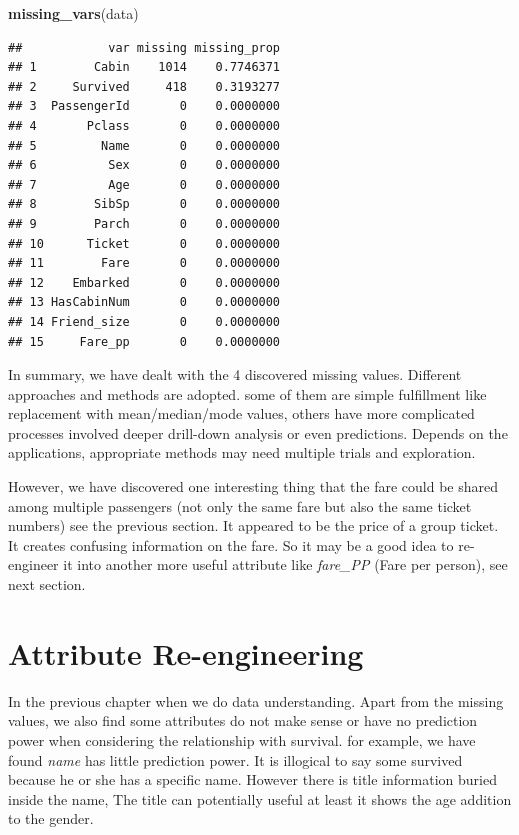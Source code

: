 \documentclass[
]{book}
\newenvironment{Shaded}{\begin{snugshade}}{\end{snugshade}}
\newcommand{\KeywordTok}[1]{\textcolor[rgb]{0.13,0.29,0.53}{\textbf{#1}}}
\newcommand{\NormalTok}[1]{#1}
\begin{document}
\begin{Shaded}
\begin{Highlighting}[]
\KeywordTok{missing_vars}\NormalTok{(data)}
\end{Highlighting}
\end{Shaded}

\begin{verbatim}
##            var missing missing_prop
## 1        Cabin    1014    0.7746371
## 2     Survived     418    0.3193277
## 3  PassengerId       0    0.0000000
## 4       Pclass       0    0.0000000
## 5         Name       0    0.0000000
## 6          Sex       0    0.0000000
## 7          Age       0    0.0000000
## 8        SibSp       0    0.0000000
## 9        Parch       0    0.0000000
## 10      Ticket       0    0.0000000
## 11        Fare       0    0.0000000
## 12    Embarked       0    0.0000000
## 13 HasCabinNum       0    0.0000000
## 14 Friend_size       0    0.0000000
## 15     Fare_pp       0    0.0000000
\end{verbatim}

In summary, we have dealt with the 4 discovered missing values. Different approaches and methods are adopted. some of them are simple fulfillment like replacement with mean/median/mode values, others have more complicated processes involved deeper drill-down analysis or even predictions. Depends on the applications, appropriate methods may need multiple trials and exploration.

However, we have discovered one interesting thing that the fare could be shared among multiple passengers (not only the same fare but also the same ticket numbers) see the previous section. It appeared to be the price of a group ticket. It creates confusing information on the fare. So it may be a good idea to re-engineer it into another more useful attribute like \emph{fare\_PP} (Fare per person), see next section.

\hypertarget{attribute-re-engineering}{%
\section{Attribute Re-engineering}\label{attribute-re-engineering}}

In the previous chapter when we do data understanding. Apart from the missing values, we also find some attributes do not make sense or have no prediction power when considering the relationship with survival. for example, we have found \emph{name} has little prediction power. It is illogical to say some survived because he or she has a specific name. However there is title information buried inside the name, The title can potentially useful at least it shows the age addition to the gender.
\end{document}
